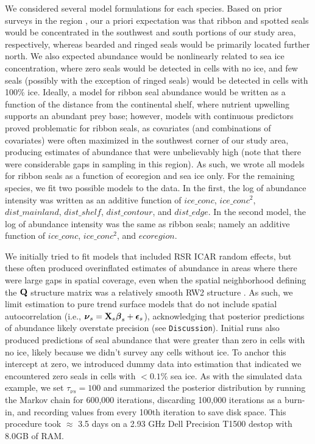 \documentclass[12pt,fleqn]{article}
\begin{document}
\begin{flushleft}
\hspace{.5in}We considered several model formulations for each species.  Based on prior surveys in the region \citep[see e.g.][]{BengtsonEtAl2005,ConnEtAl2013,VerHoefEtAl2013}, our a priori expectation was that ribbon and spotted seals would be concentrated in the southwest and south portions of our study area, respectively, whereas bearded and ringed seals would be primarily located further north.  We also expected abundance would be nonlinearly related to sea ice concentration, where zero seals would be detected in cells with no ice, and few seals (possibly with the exception of ringed seals) would be detected in cells with 100\% ice.  Ideally, a model for ribbon seal abundance would be written as a function of the distance from the continental shelf, where nutrient upwelling supports an abundant prey base; however, models with continuous predictors proved problematic for ribbon seals, as covariates (and combinations of covariates) were often maximized in the southwest corner of our study area, producing estimates of abundance that were unbelievably high (note that there were considerable gaps in sampling in this region).  As such, we wrote all models for ribbon seals as a function of ecoregion and sea ice only.  For the remaining species,
we fit two possible models to the data.  In the first, the log of abundance intensity was written as an additive function of $ice\_conc$, $ice\_conc^2$, $dist\_mainland$, $dist\_shelf$, $dist\_contour$, and $dist\_edge$.  In the second model, the log of abundance intensity was the same as ribbon seals; namely an additive function of $ice\_conc$, $ice\_conc^2$, and $ecoregion$.

\hspace{.5in}We initially tried to fit models that included RSR ICAR random effects, but these often produced overinflated estimates of abundance in areas where there were large gaps in spatial coverage, even when the spatial neighborhood defining the ${\bf Q}$ structure matrix was a relatively smooth RW2 structure \citep[as in][section 3.4.2]{RueHeld2005}.  As such, we limit estimation to pure trend surface models that do not include spatial autocorrelation (i.e., $\boldsymbol{\nu}_s={\bf X}_s \boldsymbol{\beta}_s + \boldsymbol{\epsilon}_s$), acknowledging that posterior predictions of abundance likely overstate precision (see \texttt{Discussion}).  Initial runs also produced predictions of seal abundance that were greater than zero in cells with no ice, likely because we didn't survey any cells without ice.  To anchor this intercept at zero, we introduced dummy data into estimation that indicated we encountered zero seals in cells with $<0.1\%$ sea ice.  As with the simulated data example, we set $\tau_{\nu s}=100$ and summarized the posterior distribution by running the Markov chain for 600,000 iterations, discarding 100,000 iterations as a burn-in, and recording values from every 100th iteration to save disk space.  This procedure took $\approx$ 3.5 days on a 2.93 GHz Dell Precision T1500 destop with 8.0GB of RAM.



\end{flushleft}
\end{document}
